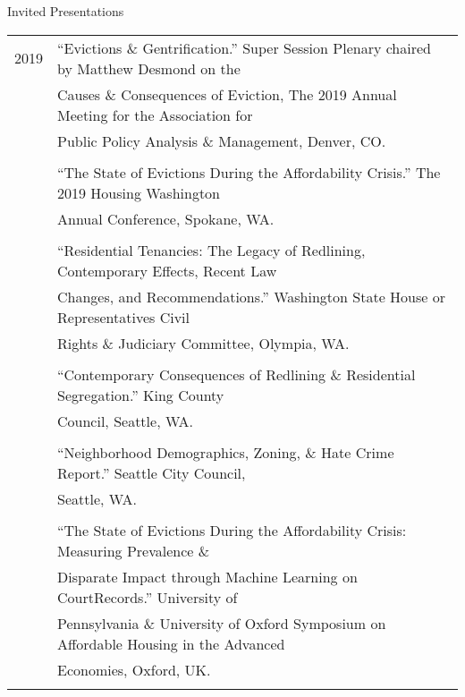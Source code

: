 \documentclass{resume} %
\begin{document}
%
%

\begin{rSection}{Invited Presentations}
\vspace{5mm}
\begin{tabular}{ @{} >{}l @{\hspace{6ex}} l }

2019	&``Evictions \& Gentrification.'' Super Session Plenary chaired by Matthew Desmond on the\\
		& Causes \& Consequences of Eviction, The 2019 Annual Meeting for the Association for\\
		& Public Policy Analysis \& Management, Denver, CO.\\\\

		&``The State of Evictions During the Affordability Crisis.'' The 2019 Housing Washington\\
		&Annual Conference, Spokane, WA.\\\\

		&``Residential Tenancies: The Legacy of Redlining, Contemporary Effects, Recent Law\\
		&Changes, and Recommendations.'' Washington State House or Representatives Civil\\
		&Rights \& Judiciary Committee, Olympia, WA.\\\\

		&``Contemporary Consequences of Redlining \& Residential Segregation.'' King County\\
		& Council, Seattle, WA.\\\\

		&``Neighborhood Demographics, Zoning, \& Hate Crime Report.'' Seattle City Council,\\
		&Seattle, WA.\\\\

		&``The State of Evictions During the Affordability Crisis: Measuring Prevalence \&\\
		&Disparate Impact through Machine Learning on CourtRecords.'' University of\\
		& Pennsylvania \& University of Oxford Symposium on Affordable Housing in the Advanced\\
		& Economies, Oxford, UK.\\\\


\end{tabular}
\end{rSection}
\end{document}

